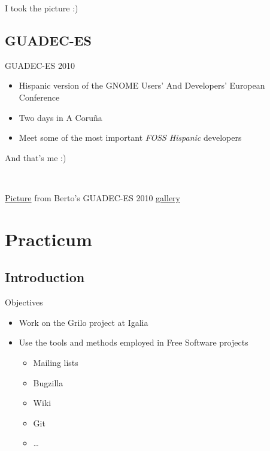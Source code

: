 \documentclass{beamer}
\begin{document}
\begin{frame}{I took the picture :)}
\begin{center}
\end{center}
\end{frame}

\subsection{GUADEC-ES}

\begin{frame}{GUADEC-ES 2010}
\begin{itemize}
  \item Hispanic version of the GNOME Users' And Developers' European Conference
  \item Two days in A Coruña
  \item Meet some of the most important {\it FOSS} {\it Hispanic} developers
\end{itemize}
\end{frame}

\begin{frame}{And that's me :)}
\begin{center}
\\
\begin{flushright}
\tiny{
\href{http://www.flickr.com/photos/bertogg/4820321931/in/set-72157624559365014/}{Picture} from Berto's GUADEC-ES 2010 \href{http://www.flickr.com/photos/bertogg/}{gallery}
}
\end{flushright}
\end{center}
\end{frame}

\section{Practicum}

\subsection{Introduction}

\begin{frame}{Objectives}
\begin{itemize}
  \item Work on the Grilo project at Igalia
  \item Use the tools and methods employed in Free Software projects
  \begin{itemize}
    \item Mailing lists
    \item Bugzilla
    \item Wiki
    \item Git
    \item \dots
  \end{itemize}
\end{itemize}
\end{frame}
\end{document}
